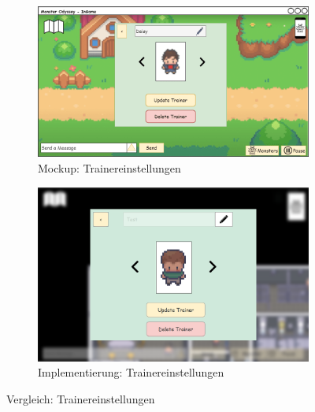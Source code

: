 \begin{figure}[H]
    \centering
    \begin{subfigure}[b]{0.4\textwidth}
        \includegraphics[width=\textwidth]{images/mockups/Bonusfeatures/TrainerSettings/TrainerSetting.png}
        \caption{Mockup: \phantom{Trainer} Trainereinstellungen}
        \label{fig: Mockup: Trainereinstellungen}
    \end{subfigure}
    \hfill
    \begin{subfigure}[b]{0.4\textwidth}
        \includegraphics[width=\textwidth]{images/implementation/Bonusfeatures/TrainerSettings/TrainerSettings.png}
        \caption{Implementierung: Trainereinstellungen}
        \label{fig: Implementierung: Trainereinstellungen}
    \end{subfigure}
    \caption{Vergleich: Trainereinstellungen}
    \label{fig: Vergleich: Trainereinstellungen}
\end{figure}

